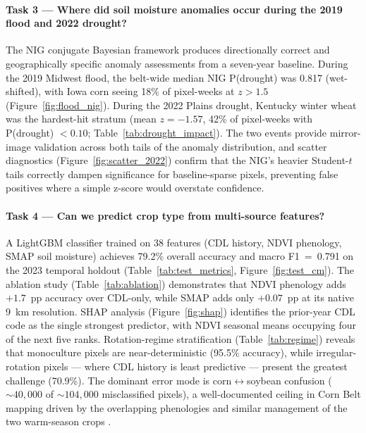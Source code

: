 \documentclass{article}
\begin{document}
\paragraph{Task 3 — Where did soil moisture anomalies occur during the
2019 flood and 2022 drought?}
The NIG conjugate Bayesian framework produces directionally correct and
geographically specific anomaly assessments from a seven-year baseline.
During the 2019 Midwest flood, the belt-wide median NIG P(drought) was
0.817 (wet-shifted), with Iowa corn seeing 18\% of pixel-weeks at
$z > 1.5$ (Figure~\ref{fig:flood_nig}).
During the 2022 Plains drought, Kentucky winter wheat was the
hardest-hit stratum (mean $z = -1.57$, 42\% of pixel-weeks with
P(drought) $< 0.10$; Table~\ref{tab:drought_impact}).
The two events provide mirror-image validation across both tails of the
anomaly distribution, and scatter diagnostics
(Figure~\ref{fig:scatter_2022}) confirm that the NIG's heavier
Student-$t$ tails correctly dampen significance for baseline-sparse
pixels, preventing false positives where a simple z-score would overstate
confidence.

\paragraph{Task 4 — Can we predict crop type from multi-source features?}
A LightGBM classifier trained on 38 features (CDL history, NDVI
phenology, SMAP soil moisture) achieves 79.2\% overall accuracy and macro
F1~=~0.791 on the 2023 temporal holdout (Table~\ref{tab:test_metrics},
Figure~\ref{fig:test_cm}).
The ablation study (Table~\ref{tab:ablation}) demonstrates that NDVI
phenology adds $+1.7$~pp accuracy over CDL-only, while SMAP adds only
$+0.07$~pp at its native 9~km resolution.
SHAP analysis (Figure~\ref{fig:shap}) identifies the prior-year CDL code
as the single strongest predictor, with NDVI seasonal means occupying four
of the next five ranks.
Rotation-regime stratification (Table~\ref{tab:regime}) reveals that
monoculture pixels are near-deterministic (95.5\% accuracy), while
irregular-rotation pixels --- where CDL history is least predictive ---
present the greatest challenge (70.9\%).
The dominant error mode is corn$\leftrightarrow$soybean confusion
(${\sim}40{,}000$ of ${\sim}104{,}000$ misclassified pixels), a
well-documented ceiling in Corn Belt mapping driven by the overlapping
phenologies and similar management of the two warm-season crops
\citep{zhong2019deep, cai2018crop}.
\end{document}
